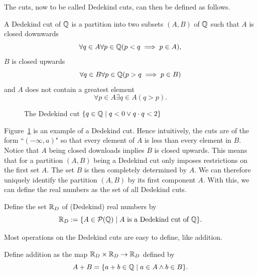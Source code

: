 \documentclass[../main.tex]{subfiles}
\begin{document}
The cuts, now to be called Dedekind cuts, can then be defined as follows.
\begin{definition}
    A Dedekind cut of $\mathbb{Q}$ is a partition into two subsets $(A,B)$ of $\mathbb{Q}$ such that $A$ is closed downwards
    \begin{equation*}
        \forall q\in A\forall p\in\mathbb{Q}(p<q\implies p\in A),
    \end{equation*}
    $B$ is closed upwards
    \begin{equation*}
        \forall q\in B\forall p\in\mathbb{Q}(p>q\implies p\in B)
    \end{equation*}
    and $A$ does not contain a greatest element
    \begin{equation*}
        \forall p\in A\exists q\in A(q>p).
    \end{equation*}
\end{definition}
\begin{figure}[!htbp]
    \centering
    
    \caption{The Dedekind cut $\{q\in\mathbb{Q}\mid q<0\lor q\cdot q<2\}$}
    \label{fig:the_real_numbers:dedekind_cut}
\end{figure}
Figure~\ref{fig:the_real_numbers:dedekind_cut} is an example of a Dedekind cut. Hence intuitively, the cuts are of the form ``$(-\infty,a)$" so that every element of $A$ is less than every element in $B$. Notice that $A$ being closed downloads implies $B$ is closed upwards. This means that for a partition $(A,B)$ being a Dedekind cut only imposes restrictions on the first set $A$. The set $B$ is then completely determined by $A$. We can therefore uniquely identify the partition $(A,B)$ by its first component $A$. With this, we can define the real numbers as the set of all Dedekind cuts.
\begin{definition}
    Define the set $\mathbb{R}_D$ of (Dedekind) real numbers by
    \begin{equation*}
        \mathbb{R}_D:=\{A\in\mathcal{P}(\mathbb{Q})\mid A\text{ is a Dedekind cut of }\mathbb{Q}\}.
    \end{equation*}
\end{definition}
Most operations on the Dedekind cuts are easy to define, like addition.
\begin{definition}
    Define addition as the map $\mathbb{R}_D\times\mathbb{R}_D\to\mathbb{R}_D$ defined by
    \begin{equation*}
        A+B=\{a+b\in\mathbb{Q}\mid a\in A\land b\in B\}.
    \end{equation*}
\end{definition}
\end{document}

